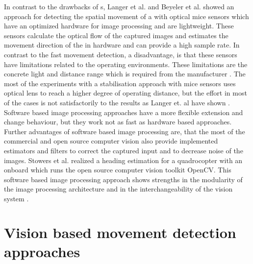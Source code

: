  In contrast to the drawbacks of \FPGA s, Langer et al.
 and
 Beyeler et al.  showed an approach for detecting
 the spatial movement of a \UAV with optical mice sensors which have an optimized
 hardware for image processing and are lightweight.
 \newpage
 These sensors calculate the optical flow of the captured images and estimates
 the movement direction of the \UAV in hardware and
can provide a high sample rate. In contrast to the fast movement detection,
a disadvantage, is that these sensors have limitations related to the operating
environments. These limitations are the concrete light and distance range which
is required from the manufacturer 
. The most of the experiments with a stabilisation approach with mice
sensors uses optical lens to reach a higher degree of operating distance, but the
effort in most of the cases is not satisfactorily to the results as Langer et.
al have shown
 . Software based image processing approaches have a more flexible
 extension and change behaviour, but they work not as fast as hardware based
 approaches. Further advantages of software based image processing are, that the
most of the commercial and open source computer vision \API also provide
implemented estimators and filters to correct the captured input and to decrease
noise of the images. Stowers et al. realized a heading estimation for a
quadrocopter with an onboard \SBC which runs the open source computer vision
toolkit OpenCV. This software based
image processing approach shows strengths in the modularity of the image processing architecture and in the interchangeability
of the vision system .

\newpage
\section{Vision based movement detection approaches}

